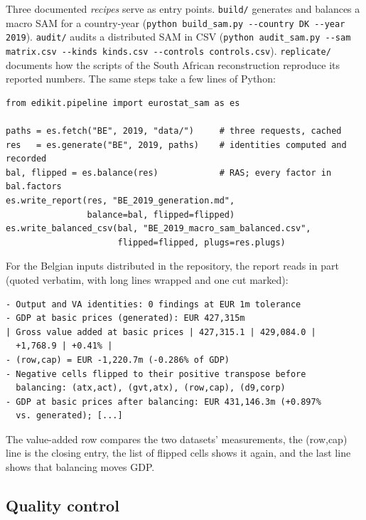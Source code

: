 \documentclass[11pt,a4paper]{article}
\begin{document}
Three documented \emph{recipes} serve as entry points. \texttt{build/}
generates and balances a macro SAM for a country-year
(\texttt{python build\_sam.py -{}-country DK -{}-year 2019}).
\texttt{audit/} audits a distributed SAM in CSV
(\texttt{python audit\_sam.py -{}-sam matrix.csv -{}-kinds kinds.csv
-{}-controls controls.csv}). \texttt{replicate/} documents how the
scripts of the South African reconstruction reproduce its reported
numbers. The same steps take a few lines of Python:

{\small
\begin{verbatim}
from edikit.pipeline import eurostat_sam as es

paths = es.fetch("BE", 2019, "data/")     # three requests, cached
res   = es.generate("BE", 2019, paths)    # identities computed and recorded
bal, flipped = es.balance(res)            # RAS; every factor in bal.factors
es.write_report(res, "BE_2019_generation.md",
                balance=bal, flipped=flipped)
es.write_balanced_csv(bal, "BE_2019_macro_sam_balanced.csv",
                      flipped=flipped, plugs=res.plugs)
\end{verbatim}}

\noindent For the Belgian inputs distributed in the repository, the report
reads in part (quoted verbatim, with long lines wrapped and one cut
marked):

{\small
\begin{verbatim}
- Output and VA identities: 0 findings at EUR 1m tolerance
- GDP at basic prices (generated): EUR 427,315m
| Gross value added at basic prices | 427,315.1 | 429,084.0 |
  +1,768.9 | +0.41% |
- (row,cap) = EUR -1,220.7m (-0.286% of GDP)
- Negative cells flipped to their positive transpose before
  balancing: (atx,act), (gvt,atx), (row,cap), (d9,corp)
- GDP at basic prices after balancing: EUR 431,146.3m (+0.897%
  vs. generated); [...]
\end{verbatim}}

\noindent The value-added row compares the two datasets' measurements, the
(row,cap) line is the closing entry, the list of flipped cells shows it
again, and the last line shows that balancing moves GDP.

\subsection{Quality control}
\end{document}
